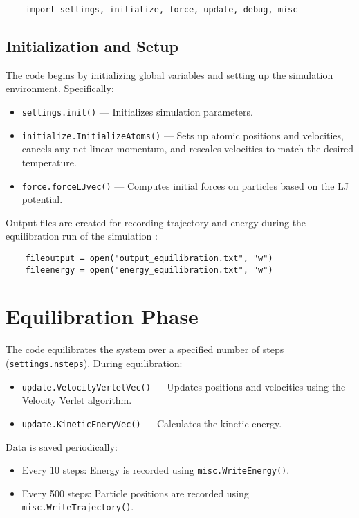 \documentclass[12pt, ngerman]{report}
\begin{document}
\begin{verbatim}
	import settings, initialize, force, update, debug, misc
\end{verbatim}

\subsection{Initialization and Setup}
The code begins by initializing global variables and setting up the simulation environment. Specifically:
\begin{itemize}
	\item \texttt{settings.init()} --- Initializes simulation parameters.
	\item \texttt{initialize.InitializeAtoms()} --- Sets up atomic positions and velocities, cancels any net linear momentum, and rescales velocities to match the desired temperature.
	\item \texttt{force.forceLJvec()} --- Computes initial forces on particles based on the LJ potential.
\end{itemize}

Output files are created for recording trajectory and energy during the equilibration run of the simulation :
\begin{verbatim}
	fileoutput = open("output_equilibration.txt", "w")
	fileenergy = open("energy_equilibration.txt", "w")
\end{verbatim}

\section{Equilibration Phase}
The code equilibrates the system over a specified number of steps (\texttt{settings.nsteps}). During equilibration:
\begin{itemize}
	\item \texttt{update.VelocityVerletVec()} --- Updates positions and velocities using the Velocity Verlet algorithm.
	\item \texttt{update.KineticEneryVec()} --- Calculates the kinetic energy.
\end{itemize}

Data is saved periodically:
\begin{itemize}
	\item Every 10 steps: Energy is recorded using \texttt{misc.WriteEnergy()}.
	\item Every 500 steps: Particle positions are recorded using \texttt{misc.WriteTrajectory()}.
\end{itemize}
\end{document}

